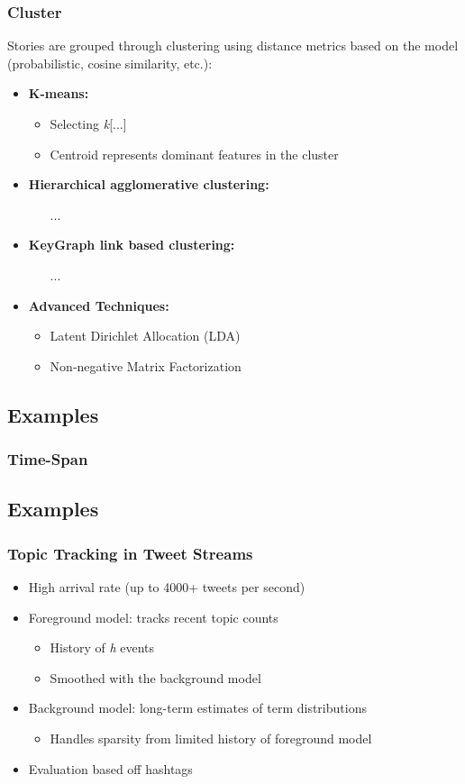 \documentclass{beamer}
\begin{document}
\begin{frame}
\frametitle{Cluster}
Stories are grouped through clustering using distance metrics based on the
model (probabilistic, cosine similarity, etc.):
\begin{itemize}
	\item {\bf K-means:}
		\begin{itemize}
			\item Selecting \emph{k}[...] 
			\item Centroid represents dominant features in the cluster
		\end{itemize}
	\item {\bf Hierarchical agglomerative clustering:}
		\begin{itemize}
			\item[...]
		\end{itemize}
	\item {\bf KeyGraph link based clustering:}
		\begin{itemize}
			\item[...]
		\end{itemize}
	\item {\bf Advanced Techniques:}
		\begin{itemize}
			\item Latent Dirichlet Allocation (LDA)
			\item Non-negative Matrix Factorization
		\end{itemize}
\end{itemize}
\end{frame}

\subsection{Examples}
\begin{frame}
\frametitle{Time-Span}
\end{frame}

\subsection{Examples}
\begin{frame}
\frametitle{Topic Tracking in Tweet Streams \cite{Lin:2011:STA:2020408.2020476}}
\begin{itemize}
\item High arrival rate (up to 4000+ tweets per second)
\item Foreground model: tracks recent topic counts
\begin{itemize}
\item History of \emph{h} events
\item Smoothed with the background model
\end{itemize}
\item Background model: long-term estimates of term distributions
\begin{itemize}
\item Handles sparsity from limited history of foreground model
\end{itemize}
\item Evaluation based off hashtags
\end{itemize}
\end{frame}
\end{document}
